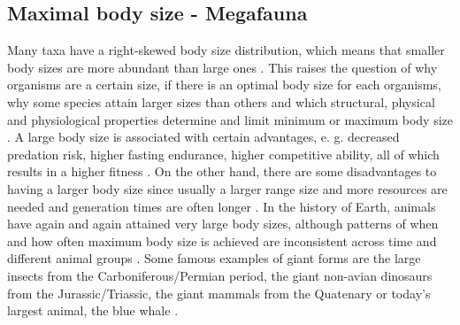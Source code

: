 


\subsection{Maximal body size - Megafauna}
Many taxa have a right-skewed body size distribution, which means that smaller body sizes are more abundant than large ones \citep{Blackburn1994a,Kozlowski2002,Lyons2008}. This raises the question of why organisms are a certain size, if there is an optimal body size for each organisms, why some species attain larger sizes than others and which 
structural, physical and physiological properties determine and limit minimum or maximum body size
\citep{Smith2009}.
A large body size is associated with certain advantages, e. g. decreased predation risk, higher fasting endurance, higher competitive ability, all of which results in a higher fitness \citep{.}.
On the other hand, there are some disadvantages to having a larger body size since usually a larger range size and more resources are needed and generation times are often longer \citep{.}.
In the history of Earth, animals have again and again attained very large body sizes, although patterns of when and how often maximum body size is achieved are inconsistent across time and different animal groups \citep{Smith2016}.
Some famous examples of giant forms are the large insects from the Carboniferous/Permian period, the giant non-avian dinosaurs from the Jurassic/Triassic, the giant mammals from the Quatenary or today's largest animal, the blue whale \citep{.}.
